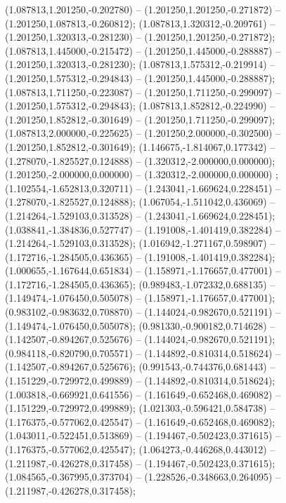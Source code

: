  (1.087813,1.201250,-0.202780) -- (1.201250,1.201250,-0.271872) -- (1.201250,1.087813,-0.260812);
 (1.087813,1.320312,-0.209761) -- (1.201250,1.320313,-0.281230) -- (1.201250,1.201250,-0.271872);
 (1.087813,1.445000,-0.215472) -- (1.201250,1.445000,-0.288887) -- (1.201250,1.320313,-0.281230);
 (1.087813,1.575312,-0.219914) -- (1.201250,1.575312,-0.294843) -- (1.201250,1.445000,-0.288887);
 (1.087813,1.711250,-0.223087) -- (1.201250,1.711250,-0.299097) -- (1.201250,1.575312,-0.294843);
 (1.087813,1.852812,-0.224990) -- (1.201250,1.852812,-0.301649) -- (1.201250,1.711250,-0.299097);
 (1.087813,2.000000,-0.225625) -- (1.201250,2.000000,-0.302500) -- (1.201250,1.852812,-0.301649);
 (1.146675,-1.814067,0.177342) -- (1.278070,-1.825527,0.124888) -- (1.320312,-2.000000,0.000000);
 (1.201250,-2.000000,0.000000) -- (1.320312,-2.000000,0.000000) ;
 (1.102554,-1.652813,0.320711) -- (1.243041,-1.669624,0.228451) -- (1.278070,-1.825527,0.124888);
 (1.067054,-1.511042,0.436069) -- (1.214264,-1.529103,0.313528) -- (1.243041,-1.669624,0.228451);
 (1.038841,-1.384836,0.527747) -- (1.191008,-1.401419,0.382284) -- (1.214264,-1.529103,0.313528);
 (1.016942,-1.271167,0.598907) -- (1.172716,-1.284505,0.436365) -- (1.191008,-1.401419,0.382284);
 (1.000655,-1.167644,0.651834) -- (1.158971,-1.176657,0.477001) -- (1.172716,-1.284505,0.436365);
 (0.989483,-1.072332,0.688135) -- (1.149474,-1.076450,0.505078) -- (1.158971,-1.176657,0.477001);
 (0.983102,-0.983632,0.708870) -- (1.144024,-0.982670,0.521191) -- (1.149474,-1.076450,0.505078);
 (0.981330,-0.900182,0.714628) -- (1.142507,-0.894267,0.525676) -- (1.144024,-0.982670,0.521191);
 (0.984118,-0.820790,0.705571) -- (1.144892,-0.810314,0.518624) -- (1.142507,-0.894267,0.525676);
 (0.991543,-0.744376,0.681443) -- (1.151229,-0.729972,0.499889) -- (1.144892,-0.810314,0.518624);
 (1.003818,-0.669921,0.641556) -- (1.161649,-0.652468,0.469082) -- (1.151229,-0.729972,0.499889);
 (1.021303,-0.596421,0.584738) -- (1.176375,-0.577062,0.425547) -- (1.161649,-0.652468,0.469082);
 (1.043011,-0.522451,0.513869) -- (1.194467,-0.502423,0.371615) -- (1.176375,-0.577062,0.425547);
 (1.064273,-0.446268,0.443012) -- (1.211987,-0.426278,0.317458) -- (1.194467,-0.502423,0.371615);
 (1.084565,-0.367995,0.373704) -- (1.228526,-0.348663,0.264095) -- (1.211987,-0.426278,0.317458);
